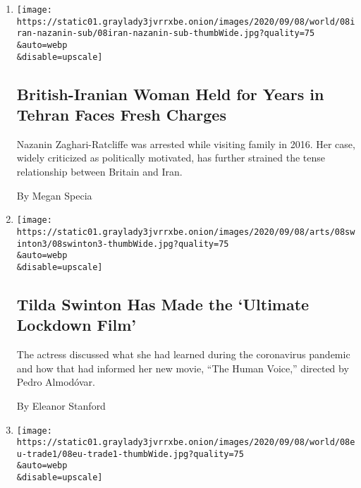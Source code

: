 \begin{enumerate}
\def\labelenumi{\arabic{enumi}.}
\item
  \href{/2020/09/08/world/middleeast/nazanin-zaghari-ratcliffe-iran-charges.html}{}

  \texttt{[image: https://static01.graylady3jvrrxbe.onion/images/2020/09/08/world/08iran-nazanin-sub/08iran-nazanin-sub-thumbWide.jpg?quality=75\\\&auto=webp\\\&disable=upscale]}

  \hypertarget{british-iranian-woman-held-for-years-in-tehran-faces-fresh-charges}{%
  \subsection{British-Iranian Woman Held for Years in Tehran Faces Fresh
  Charges}\label{british-iranian-woman-held-for-years-in-tehran-faces-fresh-charges}}

  Nazanin Zaghari-Ratcliffe was arrested while visiting family in 2016.
  Her case, widely criticized as politically motivated, has further
  strained the tense relationship between Britain and Iran.

  By Megan Specia
\item
  \href{/2020/09/08/movies/tilda-swinton-the-human-voice.html}{}

  \texttt{[image: https://static01.graylady3jvrrxbe.onion/images/2020/09/08/arts/08swinton3/08swinton3-thumbWide.jpg?quality=75\\\&auto=webp\\\&disable=upscale]}

  \hypertarget{tilda-swinton-has-made-the-ultimate-lockdown-film}{%
  \subsection{Tilda Swinton Has Made the `Ultimate Lockdown
  Film'}\label{tilda-swinton-has-made-the-ultimate-lockdown-film}}

  The actress discussed what she had learned during the coronavirus
  pandemic and how that had informed her new movie, ``The Human Voice,''
  directed by Pedro Almodóvar.

  By Eleanor Stanford
\item
  \href{/2020/09/08/world/europe/eu-commission-trade-chief.html}{}

  \texttt{[image: https://static01.graylady3jvrrxbe.onion/images/2020/09/08/world/08eu-trade1/08eu-trade1-thumbWide.jpg?quality=75\\\&auto=webp\\\&disable=upscale]}

  \hypertarget{new-eu-trade-chief-will-lead-prickly-talks-with-china-and-uk-and-us}{%
}
\end{enumerate}
